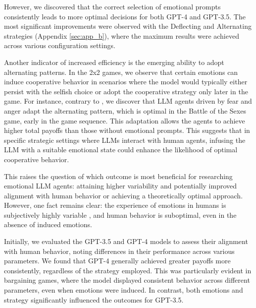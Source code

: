 \documentclass{article}
\begin{document}
However, we discovered that the correct selection of emotional prompts consistently leads to more optimal decisions for both GPT-4 and GPT-3.5. The most significant improvements were observed with the Deflecting and Alternating strategies (Appendix \ref{sec:app_b}), where the maximum results were achieved across various configuration settings. 


Another indicator of increased efficiency is the emerging ability to adopt alternating patterns. In the 2x2 games, we observe that certain emotions can induce cooperative behavior in scenarios where the model would typically either persist with the selfish choice or adopt the cooperative strategy only later in the game. For instance, contrary to \cite{akata2023playing}, we discover that LLM agents driven by fear and anger adapt the alternating pattern, which is optimal in the Battle of the Sexes game, early in the game sequence. This adaptation allows the agents to achieve higher total payoffs than those without emotional prompts. This suggests that in specific strategic settings where LLMs interact with human agents, infusing the LLM with a suitable emotional state could enhance the likelihood of optimal cooperative behavior.

This raises the question of which outcome is most beneficial for researching emotional LLM agents:  attaining higher variability and potentially improved alignment with human behavior or achieving a theoretically optimal approach. However, one fact remains clear: the experience of emotions in humans is subjectively highly variable \cite{brown2020coherence,lerner2015emotion,seo2007being}, and human behavior is suboptimal, even in the absence of induced emotions.

Initially, we evaluated the GPT-3.5 and GPT-4 models to assess their alignment with human behavior, noting differences in their performance across various parameters. We found that GPT-4 generally achieved greater payoffs more consistently, regardless of the strategy employed. This was particularly evident in bargaining games, where the model displayed consistent behavior across different parameters, even when emotions were induced. In contrast, both emotions and strategy significantly influenced the outcomes for GPT-3.5.
\end{document}
